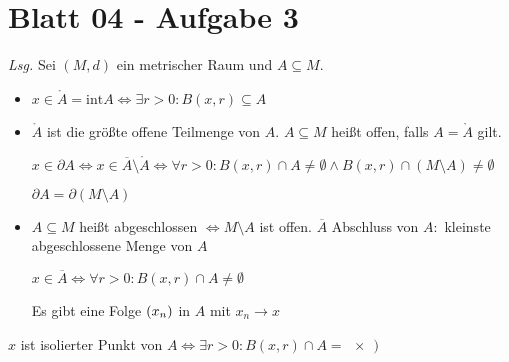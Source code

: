 \documentclass{scrreprt}
\begin{document}
\section{Blatt 04 - Aufgabe 3}

\textit{Lsg.} Sei $(M, d)$ ein metrischer Raum und $A \subseteq M$.

\begin{itemize}
\item $x \in \mathring A = \text{int} A \iff \exists r > 0 \colon B(x, r) \subseteq A$
\item $\mathring A$ ist die größte offene Teilmenge von $A$.
  $A \subseteq M$ heißt offen, falls $A = \mathring A$ gilt.

  $x \in \partial A \iff x \in \overline A \setminus \mathring A
  \iff \forall r > 0 \colon B(x, r) \cap A \ne \emptyset \land B(x, r) \cap (M \setminus A) \ne \emptyset$

  $\partial A = \partial (M \setminus A)$
\item $A \subseteq M$ heißt abgeschlossen $\iff M \setminus A$ ist offen.
  $\overline A$ Abschluss von $A \colon$ kleinste abgeschlossene Menge von $A$

  $x \in \overline A \iff \forall r > 0 \colon B(x, r) \cap A \ne \emptyset$

  Es gibt eine Folge $\qty(x_n)$ in $A$ mit $x_n \to x$
\end{itemize}

$x$ ist isolierter Punkt von $A \iff \exists r > 0 \colon B(x, r) \cap A = \qty{x})$
\end{document}
